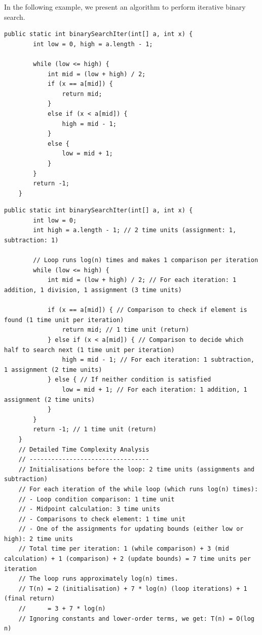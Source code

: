 \begin{example}

In the following example, we present an algorithm to perform iterative binary search.

\begin{lstlisting}[style = javaStyle, caption={Binary Search Iterative}, label={lst:java_binary_search_none}]
    public static int binarySearchIter(int[] a, int x) {
        int low = 0, high = a.length - 1;

        while (low <= high) {
            int mid = (low + high) / 2;
            if (x == a[mid]) {
                return mid;
            } 
            else if (x < a[mid]) {
                high = mid - 1;
            } 
            else {
                low = mid + 1;
            }
        }
        return -1;
    }
\end{lstlisting}

\begin{lstlisting}[style=javaStyle, caption={Binary Search Iterative}, label={lst:java_binary_search}]
    public static int binarySearchIter(int[] a, int x) {
        int low = 0;
        int high = a.length - 1; // 2 time units (assignment: 1, subtraction: 1)

        // Loop runs log(n) times and makes 1 comparison per iteration
        while (low <= high) {
            int mid = (low + high) / 2; // For each iteration: 1 addition, 1 division, 1 assignment (3 time units)

            if (x == a[mid]) { // Comparison to check if element is found (1 time unit per iteration)
                return mid; // 1 time unit (return)
            } else if (x < a[mid]) { // Comparison to decide which half to search next (1 time unit per iteration)
                high = mid - 1; // For each iteration: 1 subtraction, 1 assignment (2 time units)
            } else { // If neither condition is satisfied
                low = mid + 1; // For each iteration: 1 addition, 1 assignment (2 time units)
            }
        }
        return -1; // 1 time unit (return)
    }
    // Detailed Time Complexity Analysis
    // ---------------------------------
    // Initialisations before the loop: 2 time units (assignments and subtraction)
    // For each iteration of the while loop (which runs log(n) times):
    // - Loop condition comparison: 1 time unit
    // - Midpoint calculation: 3 time units
    // - Comparisons to check element: 1 time unit
    // - One of the assignments for updating bounds (either low or high): 2 time units
    // Total time per iteration: 1 (while comparison) + 3 (mid calculation) + 1 (comparison) + 2 (update bounds) = 7 time units per iteration
    // The loop runs approximately log(n) times.
    // T(n) = 2 (initialisation) + 7 * log(n) (loop iterations) + 1 (final return)
    //      = 3 + 7 * log(n)
    // Ignoring constants and lower-order terms, we get: T(n) = O(log n)

\end{lstlisting}
    
\end{example}

